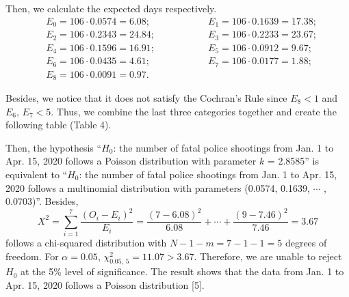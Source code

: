 \documentclass[a4paper]{article}
\begin{document}
	Then, we calculate the expected days respectively.
\begin{equation}
\begin{split}
&E_0=106\cdot0.0574=6.08; \qquad \qquad \qquad E_1=106\cdot0.1639=17.38;  \\
&E_2=106\cdot0.2343=24.84;\qquad \qquad \,\,\,\,\,\,\,\,\, E_3=106\cdot0.2233=23.67;  \\
&E_4=106\cdot0.1596=16.91;\qquad \qquad \,\,\,\,\,\,\,\,\, E_5=106\cdot0.0912=9.67;  \\
&E_6=106\cdot0.0435=4.61;\qquad \qquad \,\,\,\,\,\,\,\,\,\,\,\, E_7=106\cdot0.0177=1.88;  \\
&E_8=106\cdot0.0091=0.97.  
\nonumber
\end{split}
\end{equation}    
    
	Besides, we notice that it does not satisfy the Cochran's Rule since $E_8<1$ and $E_6,\, E_7 <5$. Thus, we combine the last three categories together and create the following table (Table 4).
\begin{table}[H]
\centering
{}
\caption{Expected and observed days with different numbers of fatal police shootings.}
\end{table}
	Then, the hypothesis “$H_0$: the number of fatal police shootings from Jan. 1 to Apr. 15, 2020 follows a Poisson distribution with parameter $k$ = 2.8585” is equivalent to “$H_0$: the number of fatal police shootings from Jan. 1 to Apr. 15, 2020 follows a multinomial distribution with parameters (0.0574, 0.1639, $\cdots$ , 0.0703)”. Besides, $$X^2=\sum\limits_{i=1}^7\frac{(O_i-E_i)^2}{E_i}=\frac{(7-6.08)^2}{6.08}+\cdots+\frac{(9-7.46)^2}{7.46}=3.67$$ follows a chi-squared distribution with $N-1-m=7-1-1=5$ degrees of freedom. For $\alpha=0.05$, $\chi^2_{0.05,\,5}=11.07>3.67$. Therefore, we are unable to reject $H_0$ at the 5\% level of significance. The result shows that the data from Jan. 1 to Apr. 15, 2020 follows a Poisson distribution [5].
\end{document}
